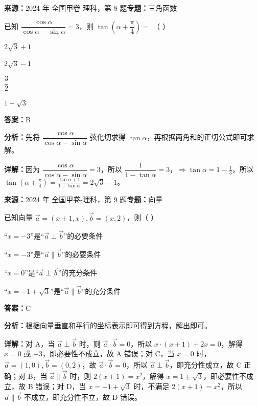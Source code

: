 \begin{question}[points=5]
\textbf{来源：}2024 年 全国甲卷-理科，第 8 题\quad \textbf{专题：}三角函数\par
已知 $\dfrac{\cos\alpha}{\cos\alpha-\sin\alpha}=3$，则 $\tan\left(\alpha+\dfrac{\pi}{4}\right)=$ （   ）
\begin{choices}
  \item $2\sqrt{3}+1$
  \item $2\sqrt{3}-1$
  \item $\dfrac{3}{2}$
  \item $1-\sqrt{3}$
\end{choices}
\begin{solution}
\textbf{答案：}B

\textbf{分析：}先将 $\dfrac{\cos\alpha}{\cos\alpha-\sin\alpha}$ 弦化切求得 $\tan\alpha$，再根据两角和的正切公式即可求解。

\textbf{详解：}因为 $\dfrac{\cos\alpha}{\cos\alpha-\sin\alpha}=3$，所以 $\dfrac{1}{1-\tan\alpha}=3$，$\Rightarrow\tan\alpha=1-\frac{1}{3}$，所以 $\tan\left(\alpha+\frac{\pi}{4}\right)=\frac{\tan\alpha+1}{1-\tan\alpha}=2\sqrt{3}-1$。
\end{solution}
\end{question}

\begin{question}[points=5]
\textbf{来源：}2024 年 全国甲卷-理科，第 9 题\quad \textbf{专题：}向量\par
已知向量 $\vec{a}=(x+1,x),\vec{b}=(x,2)$，则（   ）
\begin{choices}
  \item “$x=-3$”是“$\vec{a}\perp\vec{b}$”的必要条件
  \item “$x=-3$”是“$\vec{a}\parallel\vec{b}$”的必要条件
  \item “$x=0$”是“$\vec{a}\perp\vec{b}$”的充分条件
  \item “$x=-1+\sqrt{3}$”是“$\vec{a}\parallel\vec{b}$”的充分条件
\end{choices}
\begin{solution}
\textbf{答案：}C

\textbf{分析：}根据向量垂直和平行的坐标表示即可得到方程，解出即可。

\textbf{详解：}对 A，当 $\vec{a}\perp\vec{b}$ 时，则 $\vec{a}\cdot\vec{b}=0$，所以 $x\cdot(x+1)+2x=0$，解得 $x=0$ 或 $-3$，即必要性不成立，故 A 错误；对 C，当 $x=0$ 时，$\vec{a}=(1,0),\vec{b}=(0,2)$，故 $\vec{a}\cdot\vec{b}=0$，所以 $\vec{a}\perp\vec{b}$，即充分性成立，故 C 正确；对 B，当 $\vec{a}\parallel\vec{b}$ 时，则 $2(x+1)=x^2$，解得 $x=1\pm\sqrt{3}$，即必要性不成立，故 B 错误；对 D，当 $x=-1+\sqrt{3}$ 时，不满足 $2(x+1)=x^2$，所以 $\vec{a}\parallel\vec{b}$ 不成立，即充分性不立，故 D 错误。
\end{solution}
\end{question}

